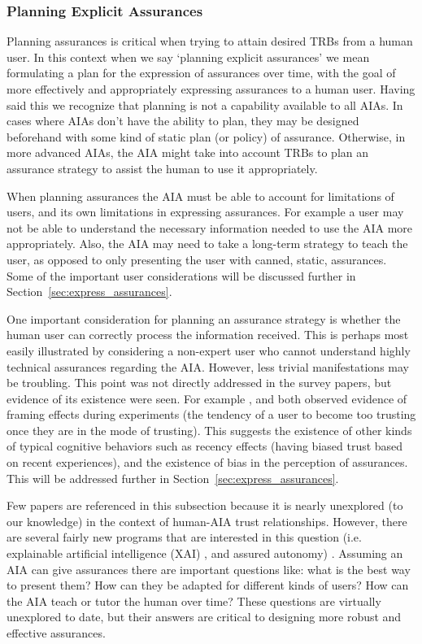     \subsubsection{Planning Explicit Assurances}
    Planning assurances is critical when trying to attain desired TRBs from a human user. In this context when we say `planning explicit assurances' we mean formulating a plan for the expression of assurances over time, with the goal of more effectively and appropriately expressing assurances to a human user. Having said this we recognize that planning is not a capability available to all AIAs. In cases where AIAs don't have the ability to plan, they may be designed beforehand with some kind of static plan (or policy) of assurance. Otherwise, in more advanced AIAs, the AIA might take into account TRBs to plan an assurance strategy to assist the human to use it appropriately.

    When planning assurances the AIA must be able to account for limitations of users, and its own limitations in expressing assurances. For example a user may not be able to understand the necessary information needed to use the AIA more appropriately. Also, the AIA may need to take a long-term strategy to teach the user, as opposed to only presenting the user with canned, static, assurances. Some of the important user considerations will be discussed further in Section~\ref{sec:express_assurances}.
    
    One important consideration for planning an assurance strategy is whether the human user can correctly process the information received. This is perhaps most easily illustrated by considering a non-expert user who cannot understand highly technical assurances regarding the AIA. However, less trivial manifestations may be troubling. This point was not directly addressed in the survey papers, but evidence of its existence were seen. For example \cite{Riley1996-qm}, and \cite{Freedy2007-sg} both observed evidence of framing effects during experiments (the tendency of a user to become too trusting once they are in the mode of trusting). This suggests the existence of other kinds of typical cognitive behaviors such as recency effects (having biased trust based on recent experiences), and the existence of bias in the perception of assurances. This will be addressed further in Section~\ref{sec:express_assurances}.

    Few papers are referenced in this subsection because it is nearly unexplored (to our knowledge) in the context of human-AIA trust relationships. However, there are several fairly new programs that are interested in this question (i.e. explainable artificial intelligence (XAI) \cite{Gunning2017-ih}, and assured autonomy) . Assuming an AIA can give assurances there are important questions like: what is the best way to present them? How can they be adapted for different kinds of users? How can the AIA teach or tutor the human over time? These questions are virtually unexplored to date, but their answers are critical to designing more robust and effective assurances.

